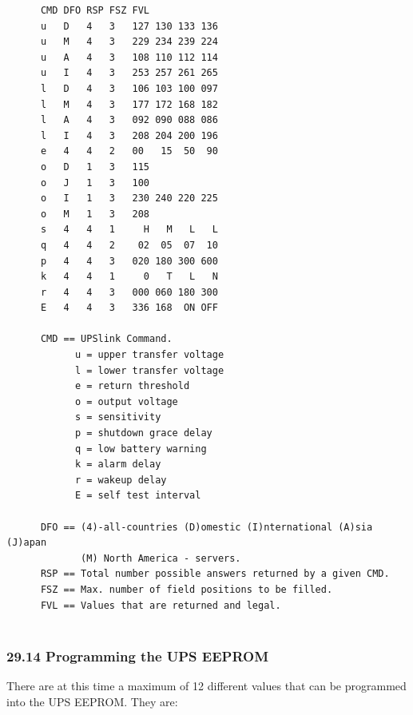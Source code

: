 {{{{{{{{{{{{{{{{{\begin{verbatim}
      CMD DFO RSP FSZ FVL
      u   D   4   3   127 130 133 136
      u   M   4   3   229 234 239 224
      u   A   4   3   108 110 112 114
      u   I   4   3   253 257 261 265
      l   D   4   3   106 103 100 097
      l   M   4   3   177 172 168 182
      l   A   4   3   092 090 088 086
      l   I   4   3   208 204 200 196
      e   4   4   2   00   15  50  90
      o   D   1   3   115
      o   J   1   3   100
      o   I   1   3   230 240 220 225
      o   M   1   3   208
      s   4   4   1     H   M   L   L
      q   4   4   2    02  05  07  10
      p   4   4   3   020 180 300 600
      k   4   4   1     0   T   L   N
      r   4   4   3   000 060 180 300
      E   4   4   3   336 168  ON OFF
     
      CMD == UPSlink Command.
            u = upper transfer voltage
            l = lower transfer voltage
            e = return threshold
            o = output voltage
            s = sensitivity
            p = shutdown grace delay
            q = low battery warning
            k = alarm delay
            r = wakeup delay
            E = self test interval
     
      DFO == (4)-all-countries (D)omestic (I)nternational (A)sia (J)apan
             (M) North America - servers.
      RSP == Total number possible answers returned by a given CMD.
      FSZ == Max. number of field positions to be filled.
      FVL == Values that are returned and legal.
     
\end{verbatim}
\normalsize

\label{Programming-the-UPS-EEPROM}

\subsubsection*{29.14 Programming the UPS EEPROM}

There are at this time a maximum of 12 different values that can be programmed
into the UPS EEPROM. They are:  

}}}}}}}}}}}}}}}}}
